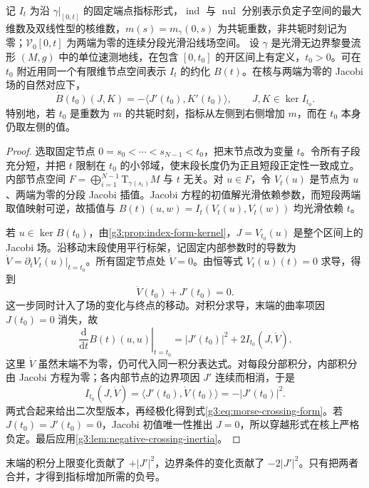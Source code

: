 \begin{proposition}\label{g3:prop:morse-crossing-form}
	记 \(I_t\) 为沿 \(\gamma|_{[0,t]}\) 的固定端点指标形式，\(\operatorname{ind}\) 与 \(\operatorname{nul}\) 分别表示负定子空间的最大维数及双线性型的核维数，\(m(s)=m_\gamma(0,s)\) 为共轭重数，非共轭时刻记为零；\(\mathcal V_0[0,t]\) 为两端为零的连续分段光滑沿线场空间。
	设 \(\gamma\) 是光滑无边界黎曼流形 \((M,g)\) 中的单位速测地线，在包含 \([0,t_0]\) 的开区间上有定义，\(t_0>0\)。可在 \(t_0\) 附近用同一个有限维节点空间表示 \(I_t\) 的约化 \(B(t)\)。在核与两端为零的 Jacobi 场的自然对应下，
	\begin{equation}\label{g3:eq:morse-crossing-form}
		\dot B(t_0)(J,K)=-\langle J'(t_0),K'(t_0)\rangle,
		\qquad J,K\in\ker I_{t_0}.
	\end{equation}
	特别地，若 \(t_0\) 是重数为 \(m\) 的共轭时刻，指标从左侧到右侧增加 \(m\)，而在 \(t_0\) 本身仍取左侧的值。
\end{proposition}
\begin{proof}
	选取固定节点 \(0=s_0<\cdots<s_{N-1}<t_0\)，把末节点改为变量 \(t\)。令所有子段充分短，并把 \(t\) 限制在 \(t_0\) 的小邻域，使末段长度仍为正且短段正定性一致成立。内部节点空间
	\(F=\bigoplus_{i=1}^{N-1}\mathrm T_{\gamma(s_i)}M\)
	与 \(t\) 无关。对 \(u\in F\)，令 \(V_t(u)\) 是节点为 \(u\)、两端为零的分段 Jacobi 插值。Jacobi 方程的初值解光滑依赖参数，而短段两端取值映射可逆，故插值与
	\(B(t)(u,w)=I_t(V_t(u),V_t(w))\)
	均光滑依赖 \(t\)。

	若 \(u\in\ker B(t_0)\)，由\cref{g3:prop:index-form-kernel}，\(J=V_{t_0}(u)\) 是整个区间上的 Jacobi 场。沿移动末段使用平行标架，记固定内部参数时的导数为 \(\dot V=\partial_tV_t(u)|_{t=t_0}\)。所有固定节点处 \(\dot V=0\)。由恒等式 \(V_t(u)(t)=0\) 求导，得到
	\[
		\dot V(t_0)+J'(t_0)=0.
	\]
	这一步同时计入了场的变化与终点的移动。对积分求导，末端的曲率项因 \(J(t_0)=0\) 消失，故
	\[
		\left.\frac{\mathrm d}{\mathrm dt}B(t)(u,u)\right|_{t=t_0}
		=|J'(t_0)|^2+2I_{t_0}(J,\dot V).
	\]
	这里 \(\dot V\) 虽然末端不为零，仍可代入同一积分表达式。对每段分部积分，内部积分由 Jacobi 方程为零；各内部节点的边界项因 \(J'\) 连续而相消，于是
	\[
		I_{t_0}(J,\dot V)=\langle J'(t_0),\dot V(t_0)\rangle=-|J'(t_0)|^2.
	\]
	两式合起来给出二次型版本，再经极化得到式\eqref{g3:eq:morse-crossing-form}。若 \(J(t_0)=J'(t_0)=0\)，Jacobi 初值唯一性推出 \(J=0\)，所以穿越形式在核上严格负定。最后应用\cref{g3:lem:negative-crossing-inertia}。
\end{proof}

末端的积分上限变化贡献了 \(+|J'|^2\)，边界条件的变化贡献了 \(-2|J'|^2\)。只有把两者合并，才得到指标增加所需的负号。

